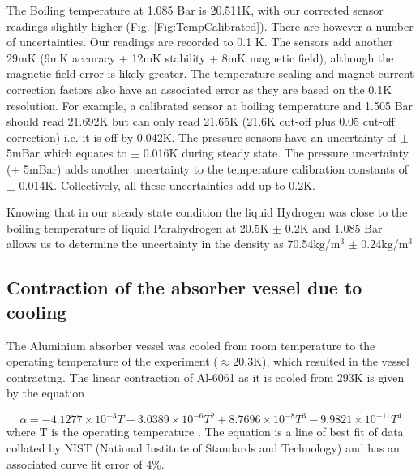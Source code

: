  The Boiling temperature at 1.085 Bar is 20.511K, with our corrected sensor readings slightly higher (Fig. \ref{Fig:TempCalibrated}). There are however a number of uncertainties. Our readings are recorded to 0.1 K. The sensors add another 29mK (9mK accuracy + 12mK stability + 8mK magnetic field), although the magnetic field error is likely greater. The temperature scaling and magnet current correction factors also have an associated error as they are based on the 0.1K resolution. For example, a calibrated sensor at boiling temperature and 1.505 Bar should read 21.692K but can only read 21.65K (21.6K cut-off plus 0.05 cut-off correction) i.e. it is off by 0.042K. The pressure sensors have an uncertainty of $\mathrm{\pm}$ 5mBar which equates to $\mathrm{\pm}$ 0.016K during steady state. The pressure uncertainty ($\mathrm{\pm}$ 5mBar) adds another uncertainty to the temperature calibration constants of $\mathrm{\pm}$ 0.014K. Collectively, all these uncertainties add up to 0.2K.
 
 Knowing that in our steady state condition the liquid Hydrogen was close to the boiling temperature of liquid Parahydrogen  \cite{NOTE524} at 20.5K $\mathrm{\pm}$ 0.2K and 1.085 Bar allows us to determine the uncertainty in the density as 70.54kg/m${}^{3}$ $\mathrm{\pm}$ 0.24kg/m${}^{3}$
 



\subsection{Contraction of the absorber vessel due to cooling}
\label{SubSect:Absorber_Contraction}

The Aluminium absorber vessel was cooled from room temperature to the operating temperature of the
experiment ($\mathrm{\approx}$20.3K), which resulted in the vessel contracting. The linear contraction of
Al-6061 as it is cooled from 293K is given by the equation

\begin{equation}
  \alpha =-4.1277\times {10}^{-3}T-3.0389\times {10}^{-6}T^2+8.7696\times {10}^{-8}T^3-9.9821\times {10}^{-11}T^4
\end{equation}
where T is the operating temperature \cite{Hardin}. The equation is a line of best fit of data collated by NIST
(National Institute of Standards and Technology) and has an associated curve fit error of 4\%.

